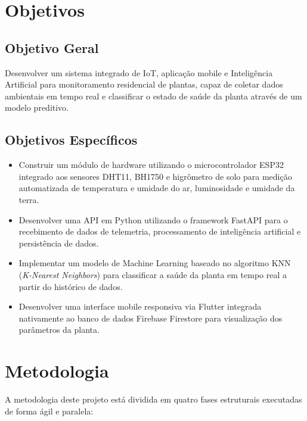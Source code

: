 \documentclass[
	12pt,
	article,
	oneside,
	a4paper,
	english,
	brazil
	]{abntex2}
\begin{document}
\section{Objetivos}

\subsection{Objetivo Geral}
Desenvolver um sistema integrado de IoT, aplicação mobile e Inteligência Artificial para monitoramento residencial de plantas, capaz de coletar dados ambientais em tempo real e classificar o estado de saúde da planta através de um modelo preditivo.

\subsection{Objetivos Específicos}
\begin{itemize}
    \item Construir um módulo de hardware utilizando o microcontrolador ESP32 integrado aos sensores DHT11, BH1750 e higrômetro de solo para medição automatizada de temperatura e umidade do ar, luminosidade e umidade da terra.
    \item Desenvolver uma API em Python utilizando o framework FastAPI para o recebimento de dados de telemetria, processamento de inteligência artificial e persistência de dados.
    \item Implementar um modelo de Machine Learning baseado no algoritmo KNN (\textit{K-Nearest Neighbors}) para classificar a saúde da planta em tempo real a partir do histórico de dados.
    \item Desenvolver uma interface mobile responsiva via Flutter integrada nativamente ao banco de dados Firebase Firestore para visualização dos parâmetros da planta.
\end{itemize}

\section{Metodologia}
A metodologia deste projeto está dividida em quatro fases estruturais executadas de forma ágil e paralela:
\end{document}
